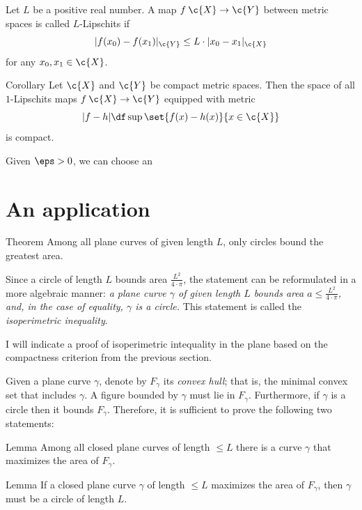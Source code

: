 Let $L$ be a positive real number.
A map $f\:\c{X}\to \c{Y}$ between metric spaces is called $L$-Lipschits if
\[|f(x_0)-f(x_1)|_{\c{Y}}\le L\cdot|x_0-x_1|_{\c{X}}\]
for any $x_0,x_1\in \c{X}$.

\begin{thm}{Corollary}
Let $\c{X}$ and $\c{Y}$ be compact metric spaces.
Then the space of all $1$-Lipschits maps $f\:\c{X}\to \c{Y}$ equipped with metric
\[|f-h|\df\sup\set{f(x)-h(x)}{x\in\c{X}}\]
is compact.
\end{thm}

Given $\eps>0$, we can choose an
\qeds

\section{An application}


\begin{thm}{Theorem}\label{thm:isoperim}
Among all plane curves of given length $L$, only circles bound the greatest area.
\end{thm}

Since a circle of length $L$ bounds area $\tfrac{L^2}{4\cdot \pi}$, the statement can be reformulated in a more algebraic manner: \textit{a plane curve $\gamma$ of given length $L$ bounds area $a\le \tfrac{L^2}{4\cdot \pi}$, and, in the case of equality, $\gamma$ is a circle.}
This statement is called the {}\emph{isoperimetric inequality}.

I will indicate a proof of isoperimetric intequality in the plane based on the compactness criterion from the previous section.

Given a plane curve $\gamma$, denote by $F_\gamma$ its {}\emph{convex hull}; that is, the minimal convex set that includes $\gamma$.
A figure bounded by $\gamma$ must lie in $F_\gamma$.
Furthermore, if $\gamma$ is a circle then it bounds $F_\gamma$.
Therefore, it is sufficient to prove the following two statements:

\begin{thm}{Lemma}\label{clm:isoperim-exist}
Among all closed plane curves of length $\le L$ there is a curve $\gamma$ that maximizes the area of $F_\gamma$.
\end{thm}

\begin{thm}{Lemma}\label{clm:isoperim-circle}
If a closed plane curve $\gamma$ of length $\le L$ maximizes the area of $F_\gamma$, then $\gamma$ must be a circle of length $L$.
\end{thm}

